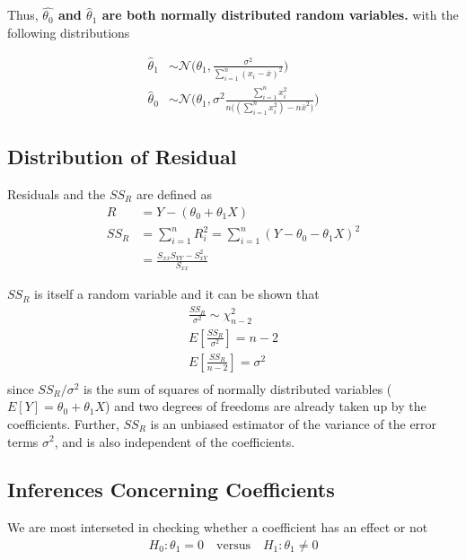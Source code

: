 \documentclass[../probability-notes.tex]{subfiles}
\begin{document}
    Thus, \textbf{$\hat{\theta_{0}}$ and $\hat{\theta}_{1}$ are both normally distributed random variables.} with the following distributions

    \begin{align*}
        \hat{\theta}_{1} &\sim \mathcal{N}\bigg(\theta_{1}, \frac{\sigma^{2}}{\sum_{i=1}^{n}(x_{i} - \overline{x})^{2}} \bigg)\\
        \hat{\theta}_{0} &\sim \mathcal{N}\bigg(\theta_{1}, \sigma^{2} \frac{\sum_{i=1}^{n} x_{i}^{2}}{n\big((\sum_{i=1}^{n} x_{i}^{2}) - n\bar{x}^{2} \big)} \bigg)
    \end{align*}


    \subsection{Distribution of Residual}
    Residuals and the $SS_{R}$ are defined as
    \begin{align*}
        R &= Y - (\theta_{0} + \theta_{1}X)\\
        SS_{R} &= \sum_{i=1}^{n} R_{i}^{2} = \sum_{i=1}^{n} (Y - \theta_{0} - \theta_{1}X)^{2}\\
        &= \frac{S_{xx}S_{YY} - S_{xY}^{2}}{S_{xx}}
    \end{align*}

    $SS_{R}$ is itself a random variable and it can be shown that
    \begin{align*}
        \frac{SS_{R}}{\sigma^{2}} \sim \chi_{n-2}^{2}\\
        E[\frac{SS_{R}}{\sigma^{2}}] = n - 2\\
        E[\frac{SS_{R}}{n-2}] = \sigma^{2}\\
    \end{align*}
    since $SS_{R}/\sigma^{2}$ is the sum of squares of normally distributed variables ($E[Y] = \theta_{0} + \theta_{1}X$) and two degrees of freedoms are already taken up by the coefficients. Further, $SS_{R}$ is an unbiased estimator of the variance of the error terms $\sigma^{2}$, and is also independent of the coefficients.

    \subsection{Inferences Concerning Coefficients}
    We are most interseted in checking whether a coefficient has an effect or not
    \begin{align*}
        H_{0}: \theta_{1} = 0 \quad \text{versus} \quad H_{1}: \theta_{1} \neq 0
    \end{align*}
\end{document}
